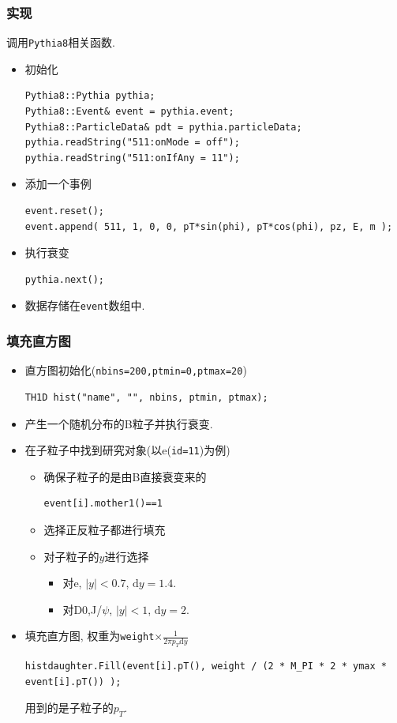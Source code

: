 \documentclass{beamer}
\newcommand{\rd}{\mathrm{d}}
\begin{document}
\begin{frame}
\frametitle{实现}
调用\texttt{Pythia8}相关函数.
	\begin{itemize}
		\item 初始化
\begin{lstlisting}[style=Cstyle, frame=single]
Pythia8::Pythia pythia; 
Pythia8::Event& event = pythia.event;
Pythia8::ParticleData& pdt = pythia.particleData;
pythia.readString("511:onMode = off");
pythia.readString("511:onIfAny = 11");
\end{lstlisting}
		\item 添加一个事例
\begin{lstlisting}[style=Cstyle, frame=single]
event.reset();
event.append( 511, 1, 0, 0, pT*sin(phi), pT*cos(phi), pz, E, m );
\end{lstlisting}
		\item 执行衰变 
\begin{lstlisting}[style=Cstyle, frame=single]
pythia.next();
\end{lstlisting}
		\item 数据存储在\texttt{event}数组中.
	\end{itemize}
\end{frame}
\begin{frame}
\frametitle{填充直方图}
	\begin{itemize}
	\item 直方图初始化(\texttt{nbins=200,ptmin=0,ptmax=20})
\begin{lstlisting}[style=Cstyle, frame=single]
TH1D hist("name", "", nbins, ptmin, ptmax);
\end{lstlisting}	
		\item 产生一个随机分布的B粒子并执行衰变.
		\item 在子粒子中找到研究对象(以e(\texttt{id=11})为例)
		\begin{itemize}
			\item 确保子粒子的是由B直接衰变来的 
\begin{lstlisting}[style=Cstyle, frame=single]
event[i].mother1()==1
\end{lstlisting}
			\item 选择{\kaishu 正反粒子}都进行填充
			\item 对子粒子的$y$进行选择
			\begin{itemize}
				\item 对e, $|y|<0.7$, $\rd y = 1.4$.
				\item 对D0,J/$\psi$, $|y|<1$, $\rd y = 2$.
			\end{itemize}
		\end{itemize}
		\item 填充直方图, 权重为\texttt{weight}$\times\frac{1}{2\pi p_T \rd y}$
\begin{lstlisting}[style=Cstyle, frame=single]
histdaughter.Fill(event[i].pT(), weight / (2 * M_PI * 2 * ymax * event[i].pT()) );
\end{lstlisting}
	{\kaishu 用到的是子粒子的$p_T$}.
	\end{itemize}
\end{frame}
\end{document}
